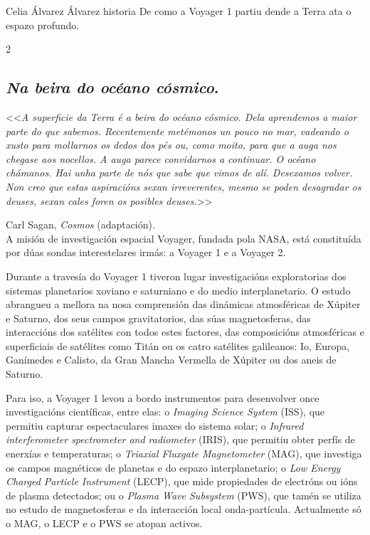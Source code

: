 \Titular*%
{Viaxeiros espaciais. Oda á Voyager 1}%
{Celia Álvarez Álvarez}%
{historia}%
{De como a Voyager 1 partiu dende a Terra ata o espazo profundo.}%

\begin{refsection}
\begin{multicols}{2}

\subsection*{\textit{Na beira do océano cósmico}.}

<<\textit{A superficie da Terra é a beira do océano cósmico. Dela aprendemos a
maior parte do que sabemos. Recentemente metémonos un pouco no mar, vadeando o
xusto para mollarnos os dedos dos pés ou, como moito, para que a auga nos
chegase aos nocellos. A auga parece convidarnos a continuar. O océano chámanos.
Hai unha parte de nós que sabe que vimos de alí. Desexamos volver. Non creo que
estas aspiracións sexan irreverentes, mesmo se poden desagradar os deuses,
sexan cales foren os posibles deuses.}>>

\hfill Carl Sagan, \textit{Cosmos} (adaptación). \\

A misión de investigación espacial Voyager, fundada pola NASA, está constituída
por dúas sondas interestelares irmás: a Voyager 1 e a Voyager 2.

Durante a travesía do Voyager 1 tiveron lugar investigacións exploratorias dos
sistemas planetarios xoviano e saturniano e do medio interplanetario. O estudo
abrangueu a mellora na nosa comprensión das dinámicas atmosféricas de Xúpiter e
Saturno, dos seus campos gravitatorios, das súas magnetosferas, das
interaccións dos satélites con todos estes factores, das composicións
atmosféricas e superficiais de satélites como Titán ou os catro satélites
galileanos: Io, Europa, Ganímedes e Calisto, da Gran Mancha Vermella de Xúpiter
ou dos aneis de Saturno.

Para iso, a Voyager 1 levou a bordo instrumentos para desenvolver once
investigacións científicas, entre elas: o \textit{Imaging Science System}
(ISS), que permitiu capturar espectaculares imaxes do sistema solar; o
\textit{Infrared interferometer spectrometer and radiometer} (IRIS), que
permitiu obter perfís de enerxías e temperaturas; o \textit{Triaxial Fluxgate
Magnetometer} (MAG), que investiga os campos magnéticos de planetas e do espazo
interplanetario; o \textit{Low Energy Charged Particle Instrument} (LECP), que
mide propiedades de electróns ou ións de plasma detectados; ou o \textit{Plasma
Wave Subsystem} (PWS), que tamén se utiliza no estudo de magnetosferas e da
interacción local onda-partícula. Actualmente só o MAG, o LECP e o PWS se
atopan activos.


\end{multicols}
\end{refsection}
